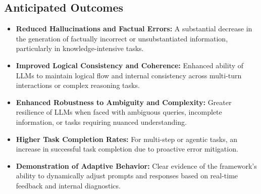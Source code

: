 \documentclass{article}
\begin{document}
\subsection{Anticipated Outcomes}
\begin{itemize}
    \item \textbf{Reduced Hallucinations and Factual Errors:} A substantial decrease in the generation of factually incorrect or unsubstantiated information, particularly in knowledge-intensive tasks.
    \item \textbf{Improved Logical Consistency and Coherence:} Enhanced ability of LLMs to maintain logical flow and internal consistency across multi-turn interactions or complex reasoning tasks.
    \item \textbf{Enhanced Robustness to Ambiguity and Complexity:} Greater resilience of LLMs when faced with ambiguous queries, incomplete information, or tasks requiring nuanced understanding.
    \item \textbf{Higher Task Completion Rates:} For multi-step or agentic tasks, an increase in successful task completion due to proactive error mitigation.
    \item \textbf{Demonstration of Adaptive Behavior:} Clear evidence of the framework's ability to dynamically adjust prompts and responses based on real-time feedback and internal diagnostics.
\end{itemize}
\end{document}
